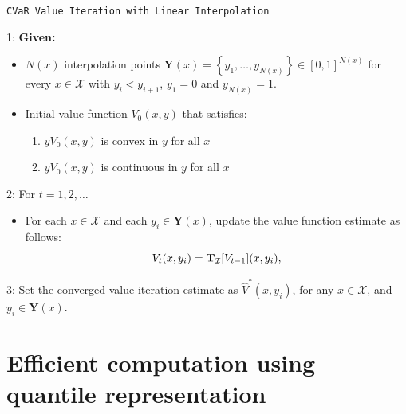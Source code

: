 \begin{algorithm}[h]
\caption{\texttt{CVaR Value Iteration with Linear Interpolation}}
\label{alg:cvarlinear}
1: \textbf{Given:}
\begin{itemize}
\item $N(x)$ interpolation points $\mathbf{Y}(x)  = \left\{y_1,\dots,y_{N(x)}\right\} \in [0,1]^{N(x)}$ for every $x\in \mathcal X$ with $y_i<y_{i+1}$, $y_1=0$ and $y_{N(x)}=1$.
\item Initial value function $V_0(x,y)$ that satisfies:
\begin{enumerate}
\item $yV_0(x,y)$ is convex in $y$ for all $x$
\item $yV_0(x,y)$ is continuous in $y$ for all $x$
\end{enumerate}
\end{itemize}
2: For $t = 1,2,\dots$
\begin{itemize}
\item For each $x \in \mathcal X$ and each $y_i\in \mathbf{Y}(x)$, update the value function estimate as follows:
  \begin{equation*}
   V_t(x,y_i)= \mathbf{T}_{\mathcal{I}}[V_{t-1}](x,y_i),
  \end{equation*}
  \end{itemize}
3: Set the converged value iteration estimate as $\widehat{V}^*(x,y_i)$, for any $x\in\mathcal X$, and $ y_i\in\mathbf{Y}(x)$.
\end{algorithm}



\section{Efficient computation using quantile representation}\label{sec:vi:linear}

